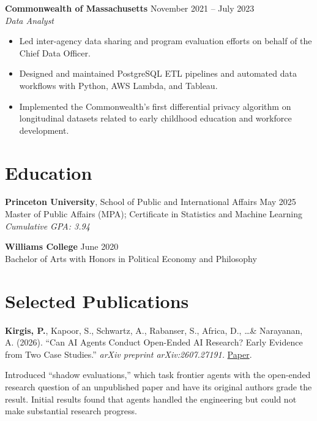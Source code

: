 \documentclass[11pt]{article}
\newcommand{\pub}[2]{%
  \par\vspace{0.5em}%
  \begin{list}{}{%
    \setlength{\leftmargin}{0.3in}%
    \setlength{\itemindent}{-0.3in}%
    \setlength{\topsep}{0pt}\setlength{\parsep}{0pt}\setlength{\partopsep}{0pt}%
  }
  \item #1%
  \par\vspace{0.2em}\small #2%
  \end{list}%
}
\begin{document}
\vspace{0.6em}
\textbf{Commonwealth of Massachusetts} \hfill November 2021 -- July 2023\\
\textit{Data Analyst}
\begin{itemize}[leftmargin=0.25in,noitemsep,topsep=2pt]
    \item Led inter-agency data sharing and program evaluation efforts on behalf of the Chief Data Officer.
    \item Designed and maintained PostgreSQL ETL pipelines and automated data workflows with Python, AWS Lambda, and Tableau.
    \item Implemented the Commonwealth's first differential privacy algorithm on longitudinal datasets related to early childhood education and workforce development.
\end{itemize}

\section*{Education}

\textbf{Princeton University}, School of Public and International Affairs \hfill May 2025\\
Master of Public Affairs (MPA); Certificate in Statistics and Machine Learning\\
\textit{Cumulative GPA: 3.94}

\vspace{0.6em}
\textbf{Williams College} \hfill June 2020\\
Bachelor of Arts with Honors in Political Economy and Philosophy

\section*{Selected Publications}

\pub{%
  \textbf{Kirgis, P.}, Kapoor, S., Schwartz, A., Rabanser, S., Africa, D., \ldots \& Narayanan, A. (2026). ``Can AI Agents Conduct Open-Ended AI Research? Early Evidence from Two Case Studies.'' \textit{arXiv preprint arXiv:2607.27191.} \href{https://arxiv.org/pdf/2607.27191}{Paper}.%
}{%
  Introduced ``shadow evaluations,'' which task frontier agents with the open-ended research question of an unpublished paper and have its original authors grade the result. Initial results found that agents handled the engineering but could not make substantial research progress.%
}
\end{document}
